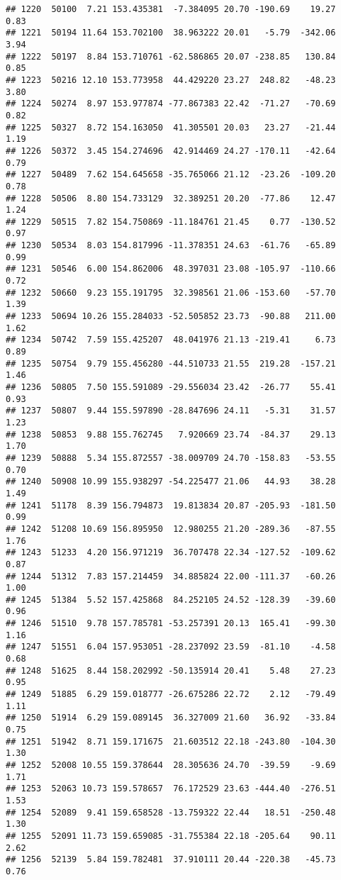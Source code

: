 \documentclass[]{article}
\begin{document}
\begin{verbatim}
## 1220  50100  7.21 153.435381  -7.384095 20.70 -190.69    19.27  0.83
## 1221  50194 11.64 153.702100  38.963222 20.01   -5.79  -342.06  3.94
## 1222  50197  8.84 153.710761 -62.586865 20.07 -238.85   130.84  0.85
## 1223  50216 12.10 153.773958  44.429220 23.27  248.82   -48.23  3.80
## 1224  50274  8.97 153.977874 -77.867383 22.42  -71.27   -70.69  0.82
## 1225  50327  8.72 154.163050  41.305501 20.03   23.27   -21.44  1.19
## 1226  50372  3.45 154.274696  42.914469 24.27 -170.11   -42.64  0.79
## 1227  50489  7.62 154.645658 -35.765066 21.12  -23.26  -109.20  0.78
## 1228  50506  8.80 154.733129  32.389251 20.20  -77.86    12.47  1.24
## 1229  50515  7.82 154.750869 -11.184761 21.45    0.77  -130.52  0.97
## 1230  50534  8.03 154.817996 -11.378351 24.63  -61.76   -65.89  0.99
## 1231  50546  6.00 154.862006  48.397031 23.08 -105.97  -110.66  0.72
## 1232  50660  9.23 155.191795  32.398561 21.06 -153.60   -57.70  1.39
## 1233  50694 10.26 155.284033 -52.505852 23.73  -90.88   211.00  1.62
## 1234  50742  7.59 155.425207  48.041976 21.13 -219.41     6.73  0.89
## 1235  50754  9.79 155.456280 -44.510733 21.55  219.28  -157.21  1.46
## 1236  50805  7.50 155.591089 -29.556034 23.42  -26.77    55.41  0.93
## 1237  50807  9.44 155.597890 -28.847696 24.11   -5.31    31.57  1.23
## 1238  50853  9.88 155.762745   7.920669 23.74  -84.37    29.13  1.70
## 1239  50888  5.34 155.872557 -38.009709 24.70 -158.83   -53.55  0.70
## 1240  50908 10.99 155.938297 -54.225477 21.06   44.93    38.28  1.49
## 1241  51178  8.39 156.794873  19.813834 20.87 -205.93  -181.50  0.99
## 1242  51208 10.69 156.895950  12.980255 21.20 -289.36   -87.55  1.76
## 1243  51233  4.20 156.971219  36.707478 22.34 -127.52  -109.62  0.87
## 1244  51312  7.83 157.214459  34.885824 22.00 -111.37   -60.26  1.00
## 1245  51384  5.52 157.425868  84.252105 24.52 -128.39   -39.60  0.96
## 1246  51510  9.78 157.785781 -53.257391 20.13  165.41   -99.30  1.16
## 1247  51551  6.04 157.953051 -28.237092 23.59  -81.10    -4.58  0.68
## 1248  51625  8.44 158.202992 -50.135914 20.41    5.48    27.23  0.95
## 1249  51885  6.29 159.018777 -26.675286 22.72    2.12   -79.49  1.11
## 1250  51914  6.29 159.089145  36.327009 21.60   36.92   -33.84  0.75
## 1251  51942  8.71 159.171675  21.603512 22.18 -243.80  -104.30  1.30
## 1252  52008 10.55 159.378644  28.305636 24.70  -39.59    -9.69  1.71
## 1253  52063 10.73 159.578657  76.172529 23.63 -444.40  -276.51  1.53
## 1254  52089  9.41 159.658528 -13.759322 22.44   18.51  -250.48  1.30
## 1255  52091 11.73 159.659085 -31.755384 22.18 -205.64    90.11  2.62
## 1256  52139  5.84 159.782481  37.910111 20.44 -220.38   -45.73  0.76

\end{verbatim}
\end{document}
